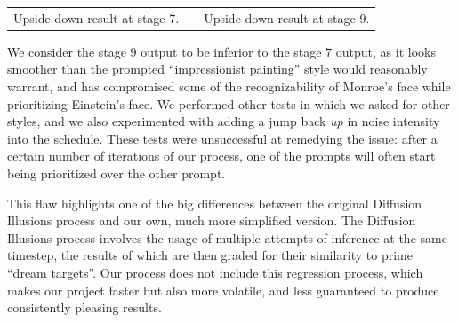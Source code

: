\documentclass[12pt,letterpaper]{article}
\begin{document}
\begin{tabular}{ >{\centering}m{2.9in} m{0.18in} >{\centering\arraybackslash}m{2.9in} }
        Upside down result at stage 7. & & Upside down result at stage 9. \\
    \end{tabular}

    We consider the stage 9 output to be inferior to the stage 7 output, as it looks smoother than the prompted ``impressionist painting'' style would reasonably warrant, and has compromised some of the recognizability of Monroe's face while prioritizing Einstein's face. We performed other tests in which we asked for other styles, and we also experimented with adding a jump back \emph{up} in noise intensity into the schedule. These tests were unsuccessful at remedying the issue: after a certain number of iterations of our process, one of the prompts will often start being prioritized over the other prompt.

    This flaw highlights one of the big differences between the original Diffusion Illusions \cite{diffusion_illusions} process and our own, much more simplified version. The Diffusion Illusions process involves the usage of multiple attempts of inference at the same timestep, the results of which are then graded for their similarity to prime ``dream targets''. Our process does not include this regression process, which makes our project faster but also more volatile, and less guaranteed to produce consistently pleasing results.

    \setlength{\parskip}{0pt}
    \printbibliography
\end{document}

